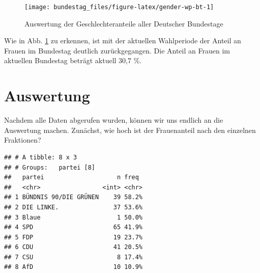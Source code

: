 \documentclass[oneside, 12pt, numbers=endperiod]{scrbook}
\newenvironment{Shaded}{\begin{snugshade}}{\end{snugshade}}
\newcommand{\DataTypeTok}[1]{\textcolor[rgb]{0.13,0.29,0.53}{#1}}
\newcommand{\DecValTok}[1]{\textcolor[rgb]{0.00,0.00,0.81}{#1}}
\newcommand{\KeywordTok}[1]{\textcolor[rgb]{0.13,0.29,0.53}{\textbf{#1}}}
\newcommand{\NormalTok}[1]{#1}
\newcommand{\OperatorTok}[1]{\textcolor[rgb]{0.81,0.36,0.00}{\textbf{#1}}}
\newcommand{\StringTok}[1]{\textcolor[rgb]{0.31,0.60,0.02}{#1}}
\theoremstyle{definition}
\theoremstyle{definition}
\theoremstyle{definition}
\theoremstyle{remark}
\begin{document}
\begin{figure}

{\centering \texttt{[image: bundestag\_files/figure-latex/gender-wp-bt-1]} 

}

\caption{Auswertung der Geschlechteranteile aller Deutscher Bundestage}\label{fig:gender-wp-bt}
\end{figure}

Wie in Abb. \ref{fig:gender-wp-bt} zu erkennen, ist mit der aktuellen
Wahlperiode der Anteil an Frauen im Bundestag deutlich zurückgegangen.
Die Anteil an Frauen im aktuellen Bundestag beträgt aktuell 30,7 \%.

\hypertarget{auswertung}{%
\chapter{Auswertung}\label{auswertung}}

Nachdem alle Daten abgerufen wurden, können wir uns endlich an die
Auswertung machen. Zunächst, wie hoch ist der Frauenanteil nach den
einzelnen Fraktionen?

\begin{Shaded}
\end{Shaded}

\begin{verbatim}
## # A tibble: 8 x 3
## # Groups:   partei [8]
##   partei                    n freq 
##   <chr>                 <int> <chr>
## 1 BÜNDNIS 90/DIE GRÜNEN    39 58.2%
## 2 DIE LINKE.               37 53.6%
## 3 Blaue                     1 50.0%
## 4 SPD                      65 41.9%
## 5 FDP                      19 23.7%
## 6 CDU                      41 20.5%
## 7 CSU                       8 17.4%
## 8 AfD                      10 10.9%
\end{verbatim}
\end{document}
